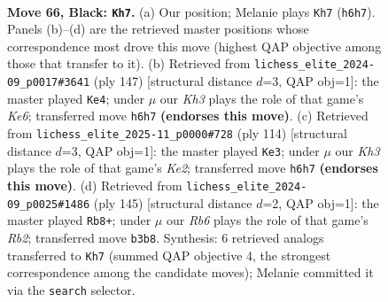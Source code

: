 \documentclass[11pt]{article}
\begin{document}
\clearpage

\begin{figure}[p]\centering
\begin{subfigure}{0.46\textwidth}\centering
\resizebox{\linewidth}{!}{%
\newchessgame
\chessboard[
  setfen={8/8/7k/R7/5K2/1r6/7P/3r4 b - - 0 66},
  showmover=false,
  pgfstyle=straightmove, color=movearrow, markmove={h6-h7}
]}
\caption{}
\end{subfigure}\hfill
\begin{subfigure}{0.46\textwidth}\centering
\resizebox{\linewidth}{!}{%
\newchessgame
\chessboard[
  setfen={8/8/7K/5R2/7P/4k3/6r1/8 b - - 24 74},
  showmover=false,
  pgfstyle=straightmove, color=movearrow, markmove={e3-e4}
]}
\caption{}
\end{subfigure}
\\[4pt]
\begin{subfigure}{0.46\textwidth}\centering
\resizebox{\linewidth}{!}{%
\newchessgame
\chessboard[
  setfen={6R1/5r2/8/8/7p/8/4K2k/8 w - - 2 58},
  showmover=false,
  pgfstyle=straightmove, color=movearrow, markmove={e2-e3}
]}
\caption{}
\end{subfigure}\hfill
\begin{subfigure}{0.46\textwidth}\centering
\resizebox{\linewidth}{!}{%
\newchessgame
\chessboard[
  setfen={6K1/1r6/7P/R7/6k1/8/8/8 b - - 4 73},
  showmover=false,
  pgfstyle=straightmove, color=movearrow, markmove={b7-b8}
]}
\caption{}
\end{subfigure}
\caption{\textbf{Move 66, Black: \texttt{Kh7}.} (a) Our position; Melanie plays \texttt{Kh7} (\texttt{h6h7}). Panels (b)--(d) are the retrieved master positions whose correspondence most drove this move (highest QAP objective among those that transfer to it). (b) Retrieved from \texttt{lichess\_elite\_2024-09\_p0017\#3641} (ply 147) [structural distance $d$=3, QAP obj=1]: the master played \texttt{Ke4}; under $\mu$ our \emph{Kh3} plays the role of that game's \emph{Ke6}; transferred move \texttt{h6h7} \textbf{(endorses this move)}. (c) Retrieved from \texttt{lichess\_elite\_2025-11\_p0000\#728} (ply 114) [structural distance $d$=3, QAP obj=1]: the master played \texttt{Ke3}; under $\mu$ our \emph{Kh3} plays the role of that game's \emph{Ke2}; transferred move \texttt{h6h7} \textbf{(endorses this move)}. (d) Retrieved from \texttt{lichess\_elite\_2024-09\_p0025\#1486} (ply 145) [structural distance $d$=2, QAP obj=1]: the master played \texttt{Rb8+}; under $\mu$ our \emph{Rb6} plays the role of that game's \emph{Rb2}; transferred move \texttt{b3b8}. Synthesis: 6 retrieved analogs transferred to \texttt{Kh7} (summed QAP objective 4, the strongest correspondence among the candidate moves); Melanie committed it via the \texttt{search} selector.}
\label{fig:thought-m131}
\end{figure}
\end{document}
